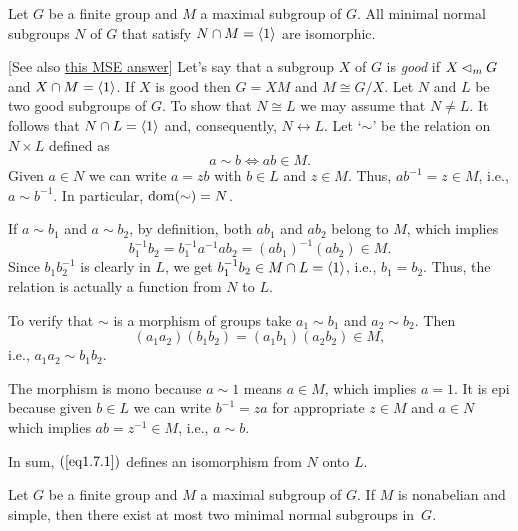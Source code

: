 \begin{exr}
     Let\/ $G$ be a finite group and\/ $M$ a maximal subgroup of\/ $G$. All minimal normal subgroups\/ $N$ of\/ $G$ that satisfy\/ $N\cap M=\langle1\rangle$ are isomorphic.
\end{exr}

\begin{solution} {[See also \href{https://math.stackexchange.com/a/2694761/269050}{this MSE answer}]} Let's say that a subgroup $X$ of $G$ is \textsl{good\/} if $X\lhd_mG$ and $X\cap M=\langle1\rangle$. If $X$ is good then $G=XM$ and $M\cong G/X$. Let $N$ and $L$ be two good subgroups of $G$. To show that $N\cong L$ we may assume that $N\ne L$. It follows that $N\cap L=\langle1\rangle$ and, consequently, $N\leftrightarrow L$. Let `$\sim$' be the relation on $N\times L$ defined as
\begin{equation}\label{eq1.7.1}
    a \sim b\iff ab\in M.
\end{equation}
Given $a\in N$ we can write $a=zb$ with $b\in L$ and $z\in M$. Thus, $ab^{-1}=z\in M$, i.e., $a\sim b^{-1}$. In particular, $\operatorname{dom}(\sim)=N$.

If $a\sim b_1$ and $a\sim b_2$, by definition, both $ab_1$ and $ab_2$ belong to $M$, which implies
$$
    b_1^{-1}b_2 = b_1^{-1}a^{-1}ab_2 = (ab_1)^{-1}(ab_2)\in M.
$$
Since $b_1b_2^{-1}$ is clearly in $L$, we get $b_1^{-1}b_2\in M\cap L=\langle1\rangle$, i.e., $b_1=b_2$. Thus, the relation is actually a function from $N$ to $L$.

To verify that $\sim$ is a morphism of groups take $a_1\sim b_1$ and $a_2\sim b_2$. Then
$$
    (a_1a_2)(b_1b_2) = (a_1b_1)(a_2b_2)\in M,
$$
i.e., $a_1a_2\sim b_1b_2$.

The morphism is mono because $a\sim 1$ means $a\in M$, which implies $a=1$. It is epi because given $b\in L$ we can write $b^{-1}=za$ for appropriate $z\in M$ and $a\in N$ which implies $ab=z^{-1}\in M$, i.e., $a\sim b$.

In sum, $(\ref{eq1.7.1})$ defines an isomorphism from $N$ onto $L$.  \end{solution}

\begin{exr}
    Let\/ $G$ be a finite group and\/ $M$ a maximal subgroup of\/ $G$. If\/ $M$ is nonabelian and simple, then there exist at most two minimal normal subgroups in\/~$G$.
\end{exr}

